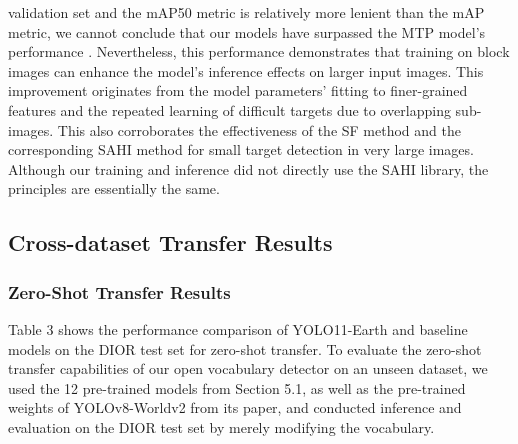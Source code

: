 \documentclass{article}
\begin{document}
validation set and the mAP50 metric is relatively more lenient than the mAP metric, we cannot conclude that 
our models have surpassed the MTP model's performance \cite{wang2024mtp}. Nevertheless, this performance demonstrates that 
training on block images can enhance the model's inference effects on larger input images. This improvement 
originates from the model parameters' fitting to finer-grained features and the repeated learning of difficult 
targets due to overlapping sub-images. This also corroborates the effectiveness of the SF method and the 
corresponding SAHI method for small target detection in very large images. Although our training and inference 
did not directly use the SAHI library, the principles are essentially the same.
\subsection{Cross-dataset Transfer Results}
\subsubsection{Zero-Shot Transfer Results}
Table 3 shows the performance comparison of YOLO11-Earth and baseline models on the DIOR test set for zero-shot 
transfer. To evaluate the zero-shot transfer capabilities of our open vocabulary detector on an unseen dataset, 
we used the 12 pre-trained models from Section 5.1, as well as the pre-trained weights of YOLOv8-Worldv2 from its 
paper, and conducted inference and evaluation on the DIOR test set by merely modifying the vocabulary.
\end{document}
